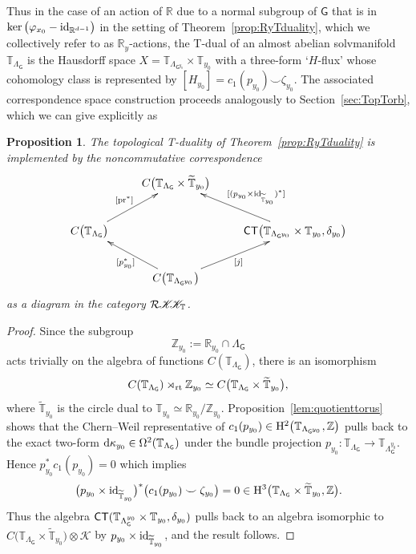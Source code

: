\documentclass[pdftex]{sigma}
\numberwithin{equation}{section}
\newcommand{\C}{\complex}
\newcommand{\Z}{\zed}
\def\dd{{\rm d}}
\def\Id{{\rm id}}
\def\T{{\sf T}}
\def\C{{\sf C}}
\newcommand{\CCK}{\mathscr{K}}
\newcommand{\CK}{\mathcal{K}}
\newcommand{\sfG}{\mathsf{G}}
\newcommand{\rmH}{{\rm H}}
\newcommand{\rt}{{\rm rt}}
\newcommand{\R}{\real}
\newcommand{\complex}{{\mathbb C}} %
\newcommand{\zed}{{\mathbb Z}} %
\newcommand{\real}{{\mathbb R}} %
\newcommand{\torus}{{\mathbb T}} %
\newtheorem{Proposition}[Theorem]{Proposition}
 { \theoremstyle{definition}
\newtheorem{Definition}[Theorem]{Definition}
\newtheorem{Note}[Theorem]{Note}
\newtheorem{Example}[Theorem]{Example}
\newtheorem{Remark}[Theorem]{Remark} }
\begin{document}
Thus in the case of an action of $\R$ due to a normal subgroup of
$\sfG$ that is in $\ker\big(\varphi_{x_0}-\Id_{\R^{d-1}}\big)$ in the setting
of Theorem~\ref{prop:RyTduality}, which we collectively refer to as $\R_y$-actions, the
T-dual of an almost abelian solvmanifold $\torus_{\Lambda_\sfG}$ is
the Hausdorff space $X=\torus_{\Lambda_{\sfG^{y_0}}}\times
\torus_{y_0}$ with a three-form `$H$-flux' whose cohomology class is
represented by $[H_{y_0}] = c_1(p_{y_0})\smile \zeta_{y_0}$.
The associated
correspondence space construction proceeds analogously to
Section~\ref{sec:TopTorb}, which we can give explicitly as
\begin{Proposition}\label{prop:Mostowcorr}
The topological T-duality of Theorem~{\rm \ref{prop:RyTduality}} is
implemented by the noncommutative
correspondence
\[
\xymatrix{
 & C\big(\torus_{\Lambda_\sfG}\times\widetilde\torus_{y_0}\big) & \\
C\big(\torus_{\Lambda_\sfG}\big) \ar[ur]^{ \! \! \! \! [{\rm pr}^*]} & &
\C\T\big(\torus_{\Lambda_{\sfG^{y_0}}}\times\torus_{y_0},\delta_{y_0}\big)
\ar[ul]_{ \ \ \
 [(p_{y_0}\times\Id_{\widetilde\torus_{y_0}})^*]} \\
 & C\big(\torus_{\Lambda_{\sfG^{y_0}}}\big) \ar[ur]_{[j]}
 \ar[ul]^{[p_{y_0}^*]} &
}
\]
as a diagram in the category $\mathcal{R}\CCK\hspace{-1mm}\CCK_{\torus}$.
\end{Proposition}
\begin{proof}
Since the subgroup
\[
\Z_{y_0}:=\R_{y_0}\cap\Lambda_\sfG
\]
acts trivially on the algebra of functions $C(\torus_{\Lambda_\sfG})$, there is an isomorphism
\[
C(\torus_{\Lambda_\sfG})\rtimes_\rt\zed_{y_0} \simeq
C\big(\torus_{\Lambda_{\sfG}}\times\widetilde\torus_{y_0}\big) ,
\]
where $\widetilde\torus_{y_0}$ is the circle dual to $\torus_{y_0}\simeq\R_{y_0}/\Z_{y_0}$.
Proposition~\ref{lem:quotienttorus} shows that the Chern--Weil
representative of
$c_1(p_{y_0})\in\rmH^2\big(\torus_{\Lambda_{\sfG^{y_0}}},\Z\big)$ pulls back to the exact
two-form $\dd\kappa_{y_0}\in\Omega^2(\torus_{\Lambda_{\sfG}})$ under
the bundle projection $p_{y_0}:\torus_{\Lambda_\sfG}\to
\torus_{\Lambda_\sfG^{y_0}}$. Hence
$p_{y_0}^*c_1(p_{y_0})=0$ which implies
\[
\big(p_{y_0}\times\Id_{\widetilde\torus_{y_0}}\big)^*\big(c_1(p_{y_0})\smile\zeta_{y_0}\big)=0 \in {\rm
 H}^3\big(\torus_{\Lambda_\sfG}\times\widetilde\torus_{y_0},\zed\big) .
\]
Thus the algebra $\C\T(\torus_{\Lambda_\sfG^{y_0}}\times\torus_{y_0},\delta_{y_0})$ pulls back to an algebra
isomorphic to
$C\big(\torus_{\Lambda_\sfG}\times\widetilde\torus_{y_0}\big)\otimes\CK$ by
$p_{y_0}\times\Id_{\widetilde\torus_{y_0}}$, and the result follows.
\end{proof}
\end{document}
